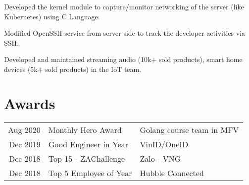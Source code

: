\documentclass[]{deedy-resume-openfont}
\begin{document}
\begin{minipage}[t]{0.69\textwidth}
\begin{tightemize}
\item Developed the kernel module to capture/monitor networking of the server (like Kubernetes) using C Language.
\item Modified OpenSSH service from server-side to track the developer activities via SSH.
\end{tightemize}
\sectionsep

\begin{tightemize}
\item Developed and maintained streaming audio (10k+ sold products), smart home devices (5k+ sold products) in the IoT team.
\end{tightemize}
\sectionsep





\section{Awards} 
\begin{tabular}{rll}
Aug 2020	     &  Monthly Hero Award & Golang course team in MFV \\
Dec 2019	     & Good Engineer in Year  & VinID/OneID \\
Dec 2018	     & Top 15 - ZAChallenge  & Zalo - VNG\\
Dec 2018         & Top 5 Employee of Year & Hubble Connected \\
\end{tabular}
\sectionsep


\end{minipage}
\end{document}
